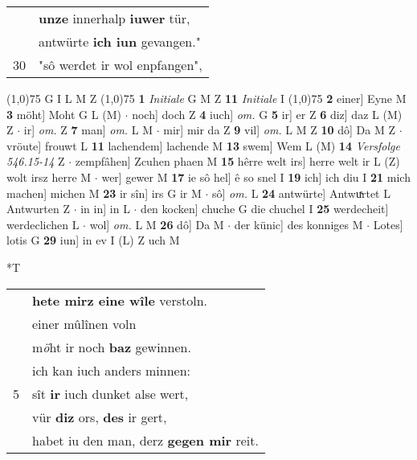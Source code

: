 \documentclass[8pt,a4paper,notitlepage]{article}
\begin{document}
\begin{table}[ht]
\begin{minipage}[t]{0.5\linewidth}
\begin{tabular}{rl}
 & \textbf{unze} innerhalp \textbf{iuwer} tür,\\ 
 & antwürte \textbf{ich iun} gevangen."\\ 
30 & "sô werdet ir wol enpfangen",\\ 
\end{tabular}
\scriptsize
\line(1,0){75} \newline
G I L M Z \newline
\line(1,0){75} \newline
\textbf{1} \textit{Initiale} G M Z  \textbf{11} \textit{Initiale} I  \newline
\line(1,0){75} \newline
\textbf{2} einer] Eyne M \textbf{3} möht] Moht G L (M)  $\cdot$ noch] doch Z \textbf{4} iuch] \textit{om.} G \textbf{5} ir] er Z \textbf{6} diz] daz L (M) Z  $\cdot$ ir] \textit{om.} Z \textbf{7} man] \textit{om.} L M  $\cdot$ mir] mir da Z \textbf{9} vil] \textit{om.} L M Z \textbf{10} dô] Da M Z  $\cdot$ vröute] frouwt L \textbf{11} lachendem] lachende M \textbf{13} swem] Wem L (M) \textbf{14} \textit{Versfolge 546.15-14} Z   $\cdot$ zempfâhen] Zcuhen phaen M \textbf{15} hêrre welt irs] herre welt ir L (Z) wolt irsz herre M  $\cdot$ wer] gewer M \textbf{17} ie sô hel] ê so snel I \textbf{19} ich] ich diu I \textbf{21} mich machen] michen M \textbf{23} ir sîn] irs G ir M  $\cdot$ sô] \textit{om.} L \textbf{24} antwürte] Antwuͯrtet L Antwurten Z  $\cdot$ in in] in L  $\cdot$ den kocken] chuche G die chuchel I \textbf{25} werdecheit] werdeclichen L  $\cdot$ wol] \textit{om.} L M \textbf{26} dô] Da M  $\cdot$ der künic] des konniges M  $\cdot$ Lotes] lotis G \textbf{29} iun] in ev I (L) Z uch M \newline
\end{minipage}
\hspace{0.5cm}
\begin{minipage}[t]{0.5\linewidth}
\small
\begin{center}*T
\end{center}
\begin{tabular}{rl}
 & \textbf{hete mirz eine wîle} verstoln.\\ 
 & einer mûlînen voln\\ 
 & m\textit{ö}ht ir noch \textbf{baz} gewinnen.\\ 
 & ich kan iuch anders minnen:\\ 
5 & sît \textbf{ir} iuch dunket alse wert,\\ 
 & vür \textbf{diz} ors, \textbf{des} ir gert,\\ 
 & habet iu den man, derz \textbf{gegen mir} reit.\\ 

\end{tabular}
\end{minipage}
\end{table}
\end{document}
